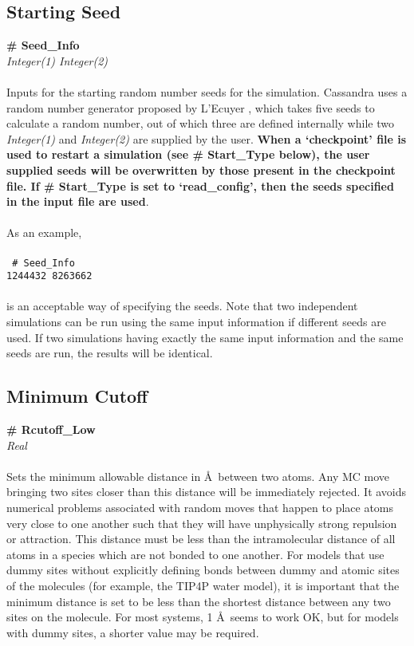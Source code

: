 %
%
\subsection{Starting Seed}\label{sec:Seed_Info}
{\bf \# Seed\_Info} \\
{\it Integer(1) Integer(2)} \\ \\
%
Inputs for the starting random number seeds for the simulation.
Cassandra uses a random  number generator proposed by L'Ecuyer \cite{random_gen:1999},
which takes five seeds to calculate a random number,
out of which three are defined internally while two {\it Integer(1)} and
{\it Integer(2)} are supplied by the user.
{\bf When a `checkpoint' file is used to restart a
simulation (see \# Start\_Type below), the user supplied seeds will be
overwritten by those present in the checkpoint file.
If \# Start\_Type is set to `read\_config',
then the seeds specified in the input file are used}.  \\ \\
As an example, \\ \\
\texttt{
\# Seed\_Info \\
1244432 8263662
} \\ \\
is an acceptable way of specifying the seeds.
Note that two independent simulations can be run using the same input
information if different seeds are used.
If two simulations having exactly the same input
information and the same seeds are run, the results will be identical.
%
%
%
\subsection{Minimum Cutoff}\label{sec:Rcutoff_Low}
{\bf \# Rcutoff\_Low} \\
{\it Real} \\ \\
%
Sets the minimum allowable distance in \AA\ between two atoms.
Any MC move bringing two sites closer than this distance will be immediately rejected.
It avoids numerical
problems associated with random moves that happen to place atoms very
close to one another such that they will have unphysically strong repulsion or
attraction. This distance must be less than the intramolecular
distance of all atoms in a species which are not bonded to one
another. For models that use dummy sites without explicitly defining
bonds between dummy and atomic sites of the molecules (for example,
the TIP4P water model), it is important that the minimum distance is set to be less
than the shortest distance between any two sites on the molecule. For
most systems, 1 \AA\ seems to work OK, but for models with dummy
sites, a shorter value may be required.
%
%
